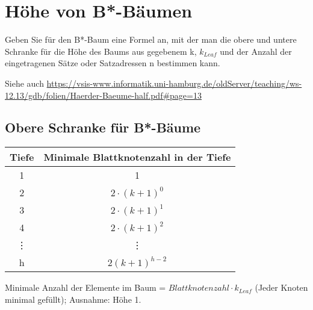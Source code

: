 \section{Höhe von B*-Bäumen}
Geben Sie für den B*-Baum eine Formel an, mit der man die obere und untere Schranke für die Höhe des Baums aus gegebenem k, $k_{Leaf}$ und der Anzahl der eingetragenen Sätze oder Satzadressen n bestimmen kann.

\begin{note}
	Siehe auch \url{https://vsis-www.informatik.uni-hamburg.de/oldServer/teaching/ws-12.13/gdb/folien/Haerder-Baeume-half.pdf\#page=13}
\end{note}

\begin{note}
\subsection*{Obere Schranke für B*-Bäume}
\begin{tabular}{cc}
	Tiefe & Minimale Blattknotenzahl in der Tiefe \\
	\hline
	1 & 1 \\
	\hline
	2 & $2\cdot (k+1)^0$ \\
	\hline
	3 & $2\cdot (k+1)^1$ \\
	\hline
	4 & $2\cdot(k+1)^2$ \\
	\hline
	\vdots & \vdots \\
	\hline
	h & $2(k+1)^{h-2}$ \\
	\hline
\end{tabular}

Minimale Anzahl der Elemente im Baum = $Blattknotenzahl \cdot k_{Leaf}$ (Jeder Knoten minimal gefüllt); Ausnahme: Höhe 1.


\end{note}

